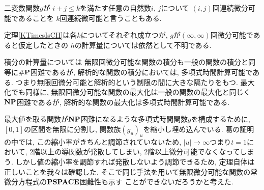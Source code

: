 二変数関数$g$が
$i+j \le k$を満たす任意の自然数$i$, $j$について
$(i,j)$回連続微分可能であることを
$k$回連続微可能と言うこともある. 

定理\ref{KTimesIsCH}は各$k$についてそれぞれ成立つが, 
$g$が$(\infty, \infty)$回微分可能であると仮定したときの
$h$の計算量については依然として不明である. 

積分の計算量については
無限回微分可能な関数の積分も一般の関数の積分と同等に$\mathbf{\#P}$困難であるが,
解析的な関数の積分においては, 多項式時間計算可能である.
つまり無限回微分可能と解析的という制限の間に大きな隔たりをもつ.
最大化でも同様に, 無限回微分可能な関数の最大化は一般の関数の最大化と同じく
$\mathbf{NP}$困難であるが,
解析的な関数の最大化は多項式時間計算可能である.


最大値を取る関数が$\mathbf{NP}$困難になるような多項式時間関数$g$を構成するために,
$[0,1]$の区間を無限に分割し, 関数族$(g_u)_u$を縮小し埋め込んでいる.
葛の証明の中では, この縮小率がきちんと調節されていないため,
$|u| \to \infty$つまり$t = 1$において,
2階以上の導関数が発散してしまい, 2階以上微分可能でなくなってしまう.
しかし値の縮小率を調節すれば発散しないよう調節できるため,
定理自体は正しいことを我々は確認した.
そこで同じ手法を用いて無限微分可能な関数の常微分方程式の$\mathbf{PSPACE}$困難性も示す
ことができないだろうかと考えた.



